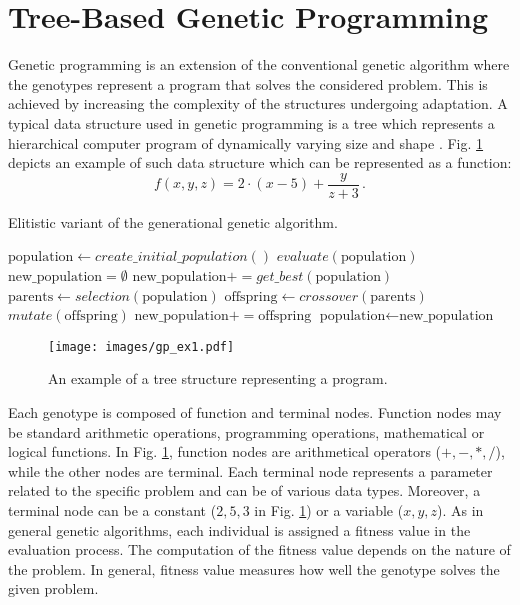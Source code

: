 \section{Tree-Based Genetic Programming}
Genetic programming is an extension of the conventional genetic algorithm where the genotypes represent a program that solves the considered problem.
This is achieved by increasing the complexity of the structures undergoing adaptation.
A typical data structure used in genetic programming is a tree which represents a hierarchical computer program of dynamically varying size and shape \cite{koza1992genetic}.
Fig. \ref{genprog:ex1} depicts an example of such data structure which can be represented as a function:
\begin{equation*}
f(x, y, z) = 2 \cdot (x-5) + \frac{y}{z + 3} \, .
\end{equation*}

\begin{algorithm}
\caption{Elitistic variant of the generational genetic algorithm.\label{genalg_g}}
\begin{algorithmic}[1]
\State $\text{population} \gets create\_initial\_population()$
\State $evaluate(\text{population})$
\State $\text{new\_population} = \emptyset$
\State $\text{new\_population} += get\_best(\text{population})$
\State $\text{parents} \gets selection(\text{population})$
\State $\text{offspring} \leftarrow crossover(\text{parents})$
\State $mutate(\text{offspring})$
\State $\text{new\_population} += \text{offspring}$
\EndWhile
\State $\text{population} \leftarrow \text{new\_population}$
\EndWhile
\end{algorithmic}
\end{algorithm}

\begin{figure}
    \centering
    \texttt{[image: images/gp\_ex1.pdf]}
    \caption{An example of a tree structure representing a program.}
    \label{genprog:ex1}
\end{figure}

Each genotype is composed of function and terminal nodes.
Function nodes may be standard arithmetic operations, programming operations, mathematical or logical functions.
In Fig. \ref{genprog:ex1}, function nodes are arithmetical operators ($+, -, *, /$), while the other nodes are terminal.
Each terminal node represents a parameter related to the specific problem and can be of various data types.
Moreover, a terminal node can be a constant ($2, 5, 3$ in Fig. \ref{genprog:ex1}) or a variable ($x, y, z$).
As in general genetic algorithms, each individual is assigned a fitness value in the evaluation process.
The computation of the fitness value depends on the nature of the problem.
In general, fitness value measures how well the genotype solves the given problem.

